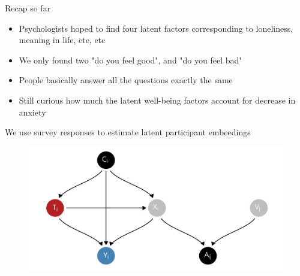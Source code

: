 \documentclass[aspectratio=169]{beamer}
\theoremstyle{remark}
\begin{document}
\begin{frame}{Recap so far}

    \begin{itemize}
        \item Psychologists hoped to find four latent factors corresponding to loneliness, meaning in life, etc, etc
        \item We only found two "do you feel good", and "do you feel bad"
        \item People basically answer all the questions exactly the same
        \item Still curious how much the latent well-being factors account for decrease in anxiety
    \end{itemize}

\end{frame}

\begin{frame}{We use survey responses to estimate latent participant embeedings}
    \centering
    \begin{figure}
        \includegraphics[width=\textwidth]{figures/dags/bipartite-mediation.png}
    \end{figure}
\end{frame}
\end{document}
